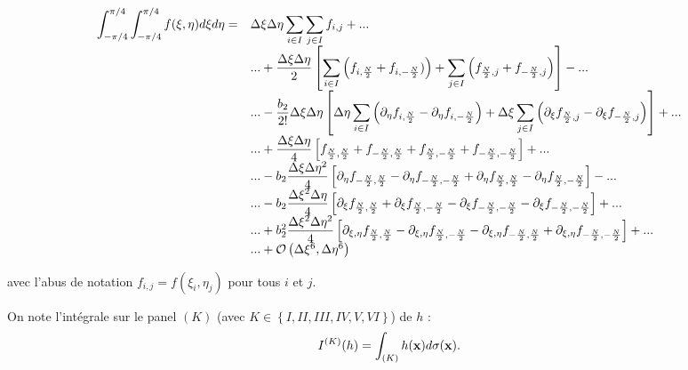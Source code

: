\begin{equation}
\begin{array}{rl}
\displaystyle\int_{-\pi/4}^{\pi/4} \displaystyle\int_{-\pi/4}^{\pi/4} f(\xi,\eta)d\xi d\eta = & \Delta \xi \Delta \eta \displaystyle\sum\limits_{i \in I} \displaystyle\sum\limits_{j \in I} f_{i,j} + ... \\
 & ... + \dfrac{\Delta \xi \Delta \eta}{2} \left[ \displaystyle\sum\limits_{i \in I} \left(  f_{i,\frac{N}{2}} + f_{i,-\frac{N}{2}})  \right) + \displaystyle\sum\limits_{j \in I} \left(  f_{\frac{N}{2},j} + f_{-\frac{N}{2},j}  \right) \right] - ... \\
 &  ... - \dfrac{b_2}{2!} \Delta \xi \Delta \eta \left[ \Delta \eta \displaystyle\sum\limits_{i \in I} \left(  \partial_{\eta }f_{i,\frac{N}{2}} -  \partial_{\eta }f_{i,-\frac{N}{2}}  \right) + \Delta \xi \displaystyle\sum\limits_{j \in I} \left(   \partial_{\xi }f_{\frac{N}{2},j} - \partial_{\xi }f_{-\frac{N}{2},j}  \right) \right] + ... \\
 & ... + \dfrac{\Delta \xi \Delta \eta}{4} \left[ f_{\frac{N}{2},\frac{N}{2}}+f_{-\frac{N}{2},\frac{N}{2}}+f_{\frac{N}{2},-\frac{N}{2}}+f_{-\frac{N}{2},-\frac{N}{2}} \right] + ... \\
 & ... - b_2 \dfrac{\Delta \xi \Delta \eta^2}{4} \left[ \partial_{\eta} f_{-\frac{N}{2},\frac{N}{2}} - \partial_{\eta} f_{-\frac{N}{2},-\frac{N}{2}} + \partial_{\eta} f_{\frac{N}{2},\frac{N}{2}} -\partial_{\eta} f_{\frac{N}{2},-\frac{N}{2}}  \right] - ... \\
  & ... - b_2 \dfrac{\Delta \xi^2 \Delta \eta}{4} \left[ \partial_{\xi} f_{\frac{N}{2},\frac{N}{2}} + \partial_{\xi} f_{\frac{N}{2},-\frac{N}{2}} - \partial_{\xi} f_{-\frac{N}{2},-\frac{N}{2}} -\partial_{\xi} f_{-\frac{N}{2},-\frac{N}{2}}  \right] + ... \\
  & ... + b_2^2 \dfrac{\Delta \xi^2 \Delta \eta^2}{4} \left[ \partial_{\xi,\eta} f_{\frac{N}{2},\frac{N}{2}} - \partial_{\xi,\eta} f_{\frac{N}{2},-\frac{N}{2}} - \partial_{\xi,\eta} f_{-\frac{N}{2},\frac{N}{2}} + \partial_{\xi,\eta} f_{-\frac{N}{2},-\frac{N}{2}} \right] + ... \\
  & ... + \mathcal{O} \left( \Delta \xi^6, \Delta \eta^6 \right)
  \end{array}
\label{eq:euler maclaurin 2d composite}
\end{equation}

avec l'abus de notation $f_{i,j} = f(\xi_i, \eta_j)$ pour tous $i$ et $j$.

On note l'intégrale sur le panel $(K)$ (avec $K \in \left\lbrace I, II, III, IV, V, VI \right\rbrace$) de $h$ :
$$I^{(K)}(h) = \displaystyle\int_{(K)} h(\mathbf{x}) d \sigma (\mathbf{x}).$$

